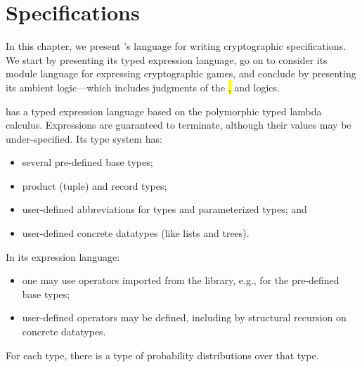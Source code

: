 \chapter{Specifications}
\label{chap:specifications}

In this chapter, we present \EasyCrypt's language for writing
cryptographic specifications.  We start by presenting its typed
expression language, go on to consider its module language for
expressing cryptographic games, and conclude by presenting its
ambient logic---which includes judgments of the \hl, \phl and \prhl
logics.

\EasyCrypt has a typed expression language based on the polymorphic
typed lambda calculus. Expressions are guaranteed to terminate,
although their values may be under-specified.  Its type system has:
\begin{itemize}
\item several pre-defined base types;

\item product (tuple) and record types;

\item user-defined abbreviations for types and parameterized types; and

\item user-defined concrete datatypes (like lists and trees).
\end{itemize}
In its expression language:
\begin{itemize}
\item one may use operators imported from the \EasyCrypt library, e.g.,
  for the pre-defined base types;

\item user-defined operators may be defined, including by
  structural recursion on concrete datatypes.
\end{itemize}
For each type, there is a type of probability distributions over that
type.

